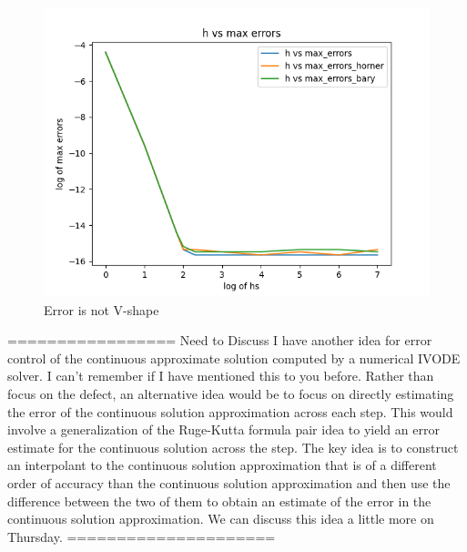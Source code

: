 \documentclass{article}
\begin{document}
\begin{figure}[H]
\centering
\includegraphics[width=0.7\linewidth]{./figures/further_work_error_is_not_v_shape_hb6}
\caption{Error is not V-shape}
\label{fig:error_is_not_v_shape}
\end{figure}

=================
Need to Discuss
I have another idea for error control of the continuous approximate
solution computed by a numerical IVODE solver. I can't remember if I
have mentioned this to you before. Rather than focus on the defect,
an alternative idea would be to focus on directly estimating
the error of the continuous solution approximation across each step.
This would involve a generalization of the Ruge-Kutta formula pair
idea to yield an error estimate for the continuous solution across
the step. The key idea is to construct an interpolant to the continuous
solution approximation that is of a different order of accuracy than the
continuous solution approximation and then use the difference between the
two of them to obtain an estimate of the error in the continuous
solution approximation. We can discuss this idea a little more on
Thursday.
=====================
\end{document}
